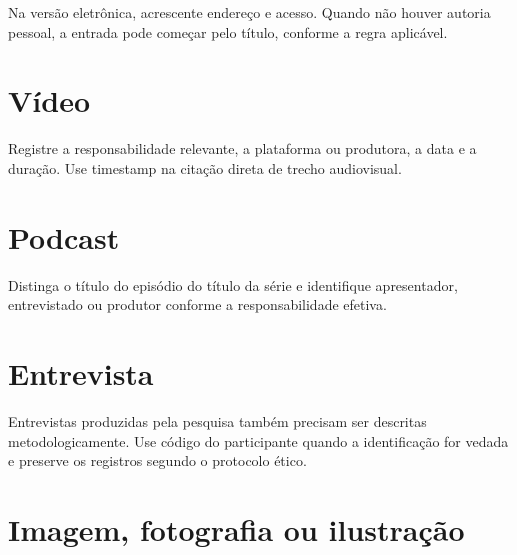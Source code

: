
Na versão eletrônica, acrescente endereço e acesso. Quando não houver autoria pessoal, a entrada pode começar pelo título, conforme a regra aplicável.

\section{Vídeo}


Registre a responsabilidade relevante, a plataforma ou produtora, a data e a duração. Use timestamp na citação direta de trecho audiovisual.

\section{Podcast}


Distinga o título do episódio do título da série e identifique apresentador, entrevistado ou produtor conforme a responsabilidade efetiva.

\section{Entrevista}


Entrevistas produzidas pela pesquisa também precisam ser descritas metodologicamente. Use código do participante quando a identificação for vedada e preserve os registros segundo o protocolo ético.

\section{Imagem, fotografia ou ilustração}

